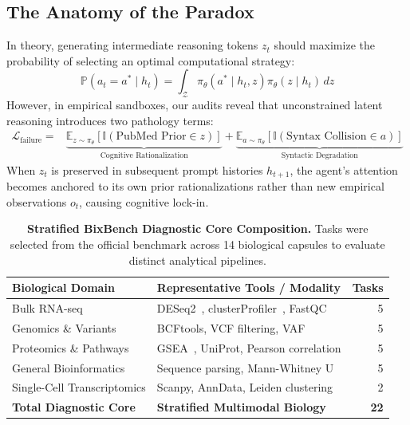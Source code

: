 \documentclass[11pt,letterpaper]{article}
\begin{document}
\subsection{The Anatomy of the Paradox}
In theory, generating intermediate reasoning tokens $z_t$ should maximize the probability of selecting an optimal computational strategy:
\begin{equation}
\mathbb{P}(a_t = a^* \mid h_t) = \int_{\mathcal{Z}} \pi_\theta(a^* \mid h_t, z) \pi_\theta(z \mid h_t) \, dz
\end{equation}
However, in empirical sandboxes, our audits reveal that unconstrained latent reasoning introduces two pathology terms:
\begin{equation}
\begin{aligned}
\mathcal{L}_{\text{failure}} = &\underbrace{\mathbb{E}_{z \sim \pi_\theta}[\mathbb{I}(\text{PubMed Prior} \in z)]}_{\text{Cognitive Rationalization}} + \underbrace{\mathbb{E}_{a \sim \pi_\theta}[\mathbb{I}(\text{Syntax Collision} \in a)]}_{\text{Syntactic Degradation}}
\end{aligned}
\end{equation}
When $z_t$ is preserved in subsequent prompt histories $h_{t+1}$, the agent's attention becomes anchored to its own prior rationalizations rather than new empirical observations $o_t$, causing cognitive lock-in.

\begin{table}[htbp]
\centering
\small
\caption{\textbf{Stratified BixBench Diagnostic Core Composition.} Tasks were selected from the official benchmark across 14 biological capsules to evaluate distinct analytical pipelines.}
\label{tab:diagnostic_core}
\begin{tabular}{llr}
\toprule
\textbf{Biological Domain} & \textbf{Representative Tools / Modality} & \textbf{Tasks} \\
\midrule
Bulk RNA-seq & DESeq2~\cite{love2014deseq2}, clusterProfiler~\cite{wu2021clusterprofiler}, FastQC & 5 \\
Genomics \& Variants & BCFtools, VCF filtering, VAF & 5 \\
Proteomics \& Pathways & GSEA~\cite{korotkevich2021fast}, UniProt, Pearson correlation & 5 \\
General Bioinformatics & Sequence parsing, Mann-Whitney U & 5 \\
Single-Cell Transcriptomics & Scanpy, AnnData, Leiden clustering & 2 \\
\midrule
\textbf{Total Diagnostic Core} & \textbf{Stratified Multimodal Biology} & \textbf{22} \\
\bottomrule
\end{tabular}
\end{table}
\end{document}
